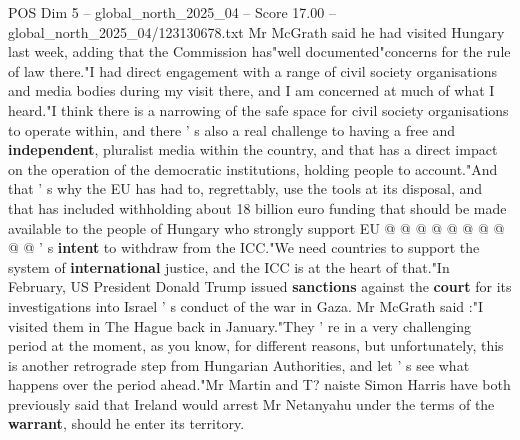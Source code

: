 \begin{textsample}{POS Dim 5 – global\_north\_2025\_04 – Score 17.00 – global\_north\_2025\_04/123130678.txt}
Mr McGrath said he had visited Hungary last week, adding that the Commission has"well documented"concerns for the rule of law there."I had direct engagement with a range of civil society organisations and media bodies during my visit there, and I am concerned at much of what I heard."I think there is a narrowing of the safe space for civil society organisations to operate within, and there ' s also a real challenge to having a free and \textbf{independent}, pluralist media within the country, and that has a direct impact on the operation of the democratic institutions, holding people to account."And that ' s why the EU has had to, regrettably, use the tools at its disposal, and that has included withholding about 18 billion euro funding that should be made available to the people of Hungary who strongly support EU @ @ @ @ @ @ @ @ @ @ ' s \textbf{intent} to withdraw from the ICC."We need countries to support the system of \textbf{international} justice, and the ICC is at the heart of that."In February, US President Donald Trump issued \textbf{sanctions} against the \textbf{court} for its investigations into Israel ' s conduct of the war in Gaza.
Mr McGrath said :"I visited them in The Hague back in January."They ' re in a very challenging period at the moment, as you know, for different reasons, but unfortunately, this is another retrograde step from Hungarian Authorities, and let ' s see what happens over the period ahead."Mr Martin and T? naiste Simon Harris have both previously said that Ireland would arrest Mr Netanyahu under the terms of the \textbf{warrant}, should he enter its territory.

\end{textsample}
